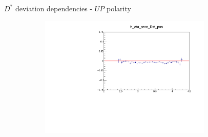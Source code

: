 \documentclass[11pt]{beamer}
\begin{document}
\begin{frame}{$D^*$ deviation dependencies - $UP$ polarity}
\begin{figure}
\begin{subfigure}{0.45\textwidth}
\end{subfigure}
\begin{subfigure}{0.45\textwidth}
\includegraphics[width=0.9\textwidth]{up_pdf/deviation/h_eta_reco_Dst_pos_dev.pdf}
\end{subfigure}
\end{figure}
\end{frame}
\end{document}
